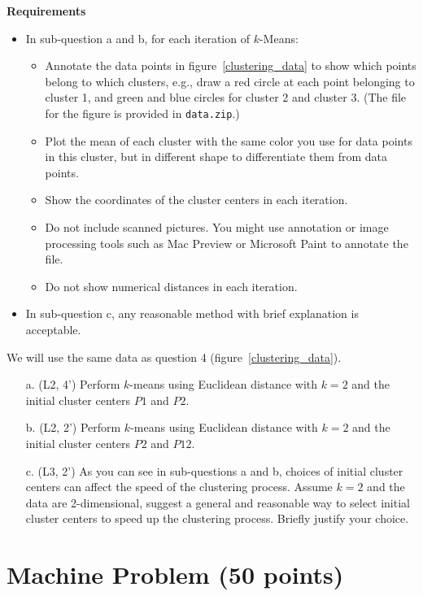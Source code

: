 \textbf{Requirements}
\begin{itemize}
	\item In sub-question a and b, for each iteration of $k$-Means:
	\begin{itemize}
	    \item Annotate the data points in figure~\ref{clustering_data} to show which points belong to which clusters, e.g., draw a red circle at each point belonging to cluster 1, and green and blue circles for cluster 2 and cluster 3. (The file for the figure is provided in {\tt data.zip}.)
        \item Plot the mean of each cluster with the same color you use for data points in this cluster, but in different shape to differentiate them from data points.
        \item Show the coordinates of the cluster centers in each iteration.
        \item Do not include scanned pictures. You might use annotation or image processing tools such
as Mac Preview or Microsoft Paint to annotate the file.
        \item Do not show numerical distances in each iteration.
	\end{itemize}
	\item In sub-question c, any reasonable method with brief explanation is acceptable.
\end{itemize}

We will use the same data as question 4 (figure~\ref{clustering_data}).

\begin{itemize}
\item[a.]  (L2, 4') Perform $k$-means using Euclidean distance with $k=2$ and the initial cluster
centers $P1$ and $P2$. 

\item[b.]  (L2, 2') Perform $k$-means using Euclidean distance with $k=2$ and the initial cluster
centers $P2$ and $P12$. 
\item[c.]  (L3, 2') As you can see in sub-questions a and b, choices of initial cluster centers can affect the speed of the clustering process. Assume $k=2$ and the data are 2-dimensional, suggest a general and reasonable way to select initial cluster centers to speed up the clustering process. Briefly justify your choice.  
\end{itemize}

\section{Machine Problem (50 points)}

